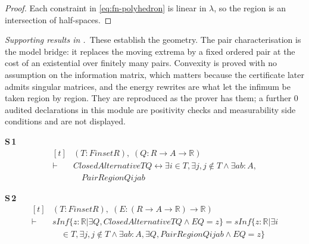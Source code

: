 \begin{proof}
Each constraint in \eqref{eq:fn-polyhedron} is linear in $\lambda$, so the region is an
intersection of half-spaces.
\end{proof}


\noindent\emph{Supporting results in .}~These establish the geometry. The pair characterisation is the model bridge: it replaces the moving extrema by a fixed ordered pair at the cost of an existential over finitely many pairs. Convexity is proved with no assumption on the information matrix, which matters because the certificate later admits singular matrices, and the energy rewrites are what let the infimum be taken region by region. They are reproduced as the prover has them; a further $0$ audited declarations in this module are positivity checks and measurability side conditions and are not displayed.

\noindent\textbf{S\,1}\quad{}
{\footnotesize\[ \begin{aligned}[t]
&(\mathit{T} : \mathit{Finset} \mathit{R}),\; (\mathit{Q} : \mathit{R} \to \mathit{A} \to \mathbb{R} )\\
\vdash\;&\mathit{ClosedAlternative} \mathit{T} \mathit{Q} \leftrightarrow \exists \mathit{i} \in \mathit{T}, \exists \mathit{j}, \mathit{j} \notin \mathit{T} \wedge \exists \mathit{a} \mathit{b} : \mathit{A},\\
&\quad \mathit{PairRegion} \mathit{Q} \mathit{i} \mathit{j} \mathit{a} \mathit{b}
\end{aligned} \]}

\noindent\textbf{S\,2}\quad{}
{\footnotesize\[ \begin{aligned}[t]
&(\mathit{T} : \mathit{Finset} \mathit{R}),\; (\mathit{E} : (\mathit{R} \to \mathit{A} \to \mathbb{R} ) \to \mathbb{R} )\\
\vdash\;&\mathit{sInf} \{ \mathit{z} : \mathbb{R} | \exists \mathit{Q}, \mathit{ClosedAlternative} \mathit{T} \mathit{Q} \wedge \mathit{E} \mathit{Q} = \mathit{z}\} = \mathit{sInf} \{ \mathit{z} : \mathbb{R} | \exists \mathit{i}\\
&\quad \in \mathit{T}, \exists \mathit{j}, \mathit{j} \notin \mathit{T} \wedge \exists \mathit{a} \mathit{b} : \mathit{A}, \exists \mathit{Q}, \mathit{PairRegion} \mathit{Q} \mathit{i} \mathit{j} \mathit{a} \mathit{b} \wedge \mathit{E} \mathit{Q} = \mathit{z}\}
\end{aligned} \]}

